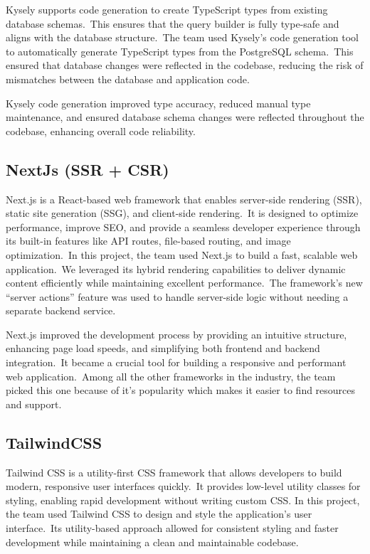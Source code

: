 Kysely supports code generation to create TypeScript types from existing database schemas.\ This ensures that the query builder is fully type-safe and aligns with the database structure.\ The team used Kysely's code generation tool to automatically generate TypeScript types from the PostgreSQL schema.\ This ensured that database changes were reflected in the codebase, reducing the risk of mismatches between the database and application code.

Kysely code generation improved type accuracy, reduced manual type maintenance, and ensured database schema changes were reflected throughout the codebase, enhancing overall code reliability.

\subsection{NextJs (SSR + CSR)}\label{subsec:nextjs-(ssr-+-csr)}

Next.js is a React-based web framework that enables server-side rendering (SSR), static site generation (SSG), and client-side rendering.\ It is designed to optimize performance, improve SEO, and provide a seamless developer experience through its built-in features like API routes, file-based routing, and image optimization.\ In this project, the team used Next.js to build a fast, scalable web application.\ We leveraged its hybrid rendering capabilities to deliver dynamic content efficiently while maintaining excellent performance.\ The framework’s new ``server actions'' feature was used to handle server-side logic without needing a separate backend service.\cite[Next.js]{nextjs}

Next.js improved the development process by providing an intuitive structure, enhancing page load speeds, and simplifying both frontend and backend integration.\ It became a crucial tool for building a responsive and performant web application.\ Among all the other frameworks in the industry, the team picked this one because of it's popularity which makes it easier to find resources and support.

\subsection{TailwindCSS}\label{subsec:tailwindcss}

Tailwind CSS is a utility-first CSS framework that allows developers to build modern, responsive user interfaces quickly.\ It provides low-level utility classes for styling, enabling rapid development without writing custom CSS. In this project, the team used Tailwind CSS to design and style the application's user interface.\ Its utility-based approach allowed for consistent styling and faster development while maintaining a clean and maintainable codebase.\cite[TailwindCSS]{tailwind}

